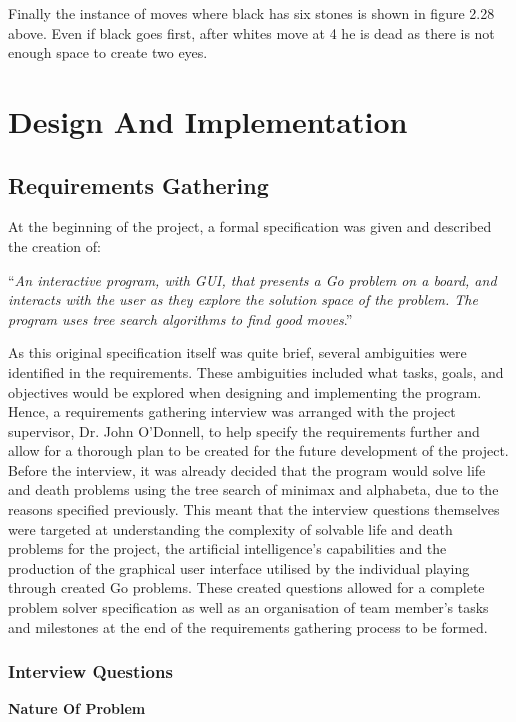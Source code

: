 \documentclass{l3proj}
\begin{document}
Finally the instance of moves where black has six stones is shown in figure 2.28 above. Even if black goes first, after whites move at 4 he is dead as there is not enough space to create two eyes.

\chapter{Design And Implementation}
\label{design}

\section{Requirements Gathering}

At the beginning of the project, a formal specification was given and described the creation of: 
\begin{center}
“\textit{An interactive program, with GUI, that presents a Go problem on a board, and interacts with the user as they explore the solution space of the problem. The program uses tree search algorithms to find good moves}.”  
\end{center}
As this original specification itself was quite brief, several ambiguities were identified in the requirements. These ambiguities included what tasks, goals, and objectives would be explored when designing and implementing the program. Hence, a requirements gathering interview was arranged with the project supervisor, Dr. John O’Donnell, to help specify the requirements further and allow for a thorough plan to be created for the future development of the project. Before the interview, it was already decided that the program would solve life and death problems using the tree search of minimax and alphabeta, due to the reasons specified previously. This meant that the interview questions themselves were targeted at understanding the complexity of solvable life and death problems for the project, the artificial intelligence's capabilities and the production of the graphical user interface utilised by the individual playing through created Go problems. These created questions allowed for a complete problem solver specification as well as an organisation of team member's tasks and milestones at the end of the requirements gathering process to be formed.

\subsection{Interview Questions}

\textbf{Nature Of Problem}
\end{document}
